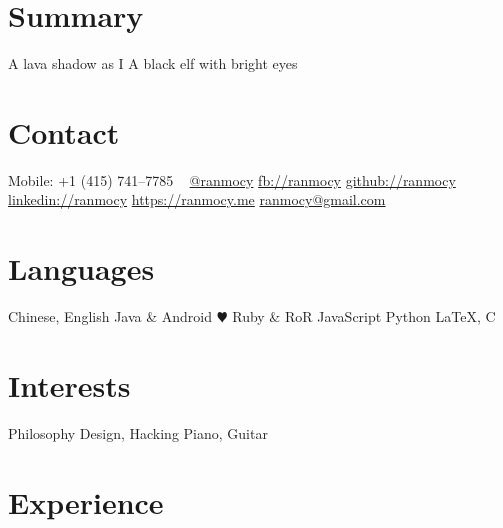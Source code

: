 \documentclass[]{friggeri-cv} %
\begin{document}


\begin{aside} %
  \section{Summary}
  A lava shadow as I
  A black elf
  with bright eyes
  \section{Contact}
  Mobile:
  +1 (415) 741--7785
  ~
  \href{https://twitter.com/ranmocy}{@ranmocy}
  \href{https://facebook.com/ranmocy}{fb://ranmocy}
  \href{https://github.com/ranmocy}{github://ranmocy}
  \href{https://www.linkedin.com/in/ranmocy}{linkedin://ranmocy}
  \href{https://ranmocy.me}{https://ranmocy.me}
  \href{mailto:ranmocy+cv@gmail.com}{ranmocy@gmail.com}
  \section{Languages}
  Chinese, English
  Java \& Android {\color{red} $\varheartsuit$}
  Ruby \& RoR
  JavaScript
  Python
  LaTeX, C
  \section{Interests}
  Philosophy
  Design, Hacking
  Piano, Guitar
\end{aside}


\section{Experience}
\end{document}
